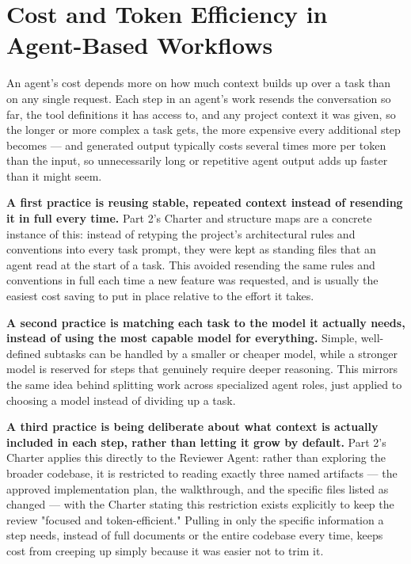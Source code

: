 \section{Cost and Token Efficiency in Agent-Based Workflows}

An agent's cost depends more on how much context builds up over a task than on any single request. Each step in an agent's work resends the conversation so far, the tool definitions it has access to, and any project context it was given, so the longer or more complex a task gets, the more expensive every additional step becomes --- and generated output typically costs several times more per token than the input, so unnecessarily long or repetitive agent output adds up faster than it might seem.

\textbf{A first practice is reusing stable, repeated context instead of resending it in full every time.} Part 2's Charter and structure maps are a concrete instance of this: instead of retyping the project's architectural rules and conventions into every task prompt, they were kept as standing files that an agent read at the start of a task. This avoided resending the same rules and conventions in full each time a new feature was requested, and is usually the easiest cost saving to put in place relative to the effort it takes.

\textbf{A second practice is matching each task to the model it actually needs, instead of using the most capable model for everything.} Simple, well-defined subtasks can be handled by a smaller or cheaper model, while a stronger model is reserved for steps that genuinely require deeper reasoning. This mirrors the same idea behind splitting work across specialized agent roles, just applied to choosing a model instead of dividing up a task.

\textbf{A third practice is being deliberate about what context is actually included in each step, rather than letting it grow by default.} Part 2's Charter applies this directly to the Reviewer Agent: rather than exploring the broader codebase, it is restricted to reading exactly three named artifacts --- the approved implementation plan, the walkthrough, and the specific files listed as changed --- with the Charter stating this restriction exists explicitly to keep the review "focused and token-efficient." Pulling in only the specific information a step needs, instead of full documents or the entire codebase every time, keeps cost from creeping up simply because it was easier not to trim it.

